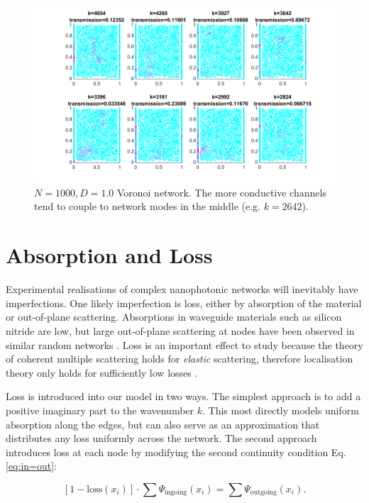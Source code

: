\begin{figure}[hbp]
  \centering
    \includegraphics[width=1\textwidth]{ch3/fig3/kmodes_N1000D10v.png}
    \caption{$N=1000, D=1.0$ Voronoi network. The more conductive channels tend to couple to network modes in the middle (e.g. $k=2642$).} 
    \label{fig:kmodes_N1000D10V}
\end{figure}



\section{Absorption and Loss}
Experimental realisations of complex nanophotonic networks will inevitably have imperfections. One likely imperfection is loss, either by absorption of the material or out-of-plane scattering. Absorptions in waveguide materials such as silicon nitride are low, but large out-of-plane scattering at nodes have been observed in similar random networks \cite{Gaio2017}. Loss is an important effect to study because the theory of coherent multiple scattering holds for \textit{elastic} scattering, therefore localisation theory only holds for sufficiently low losses \cite{Muller2011}.

Loss is introduced into our model in two ways. The simplest approach is to add a positive imaginary part to the wavenumber $k$. This most directly models uniform absorption along the edges, but can also serve as an approximation that distributes any loss uniformly across the network. The second approach introduces loss at each node by modifying the second continuity condition Eq.\ref{eq:in=out}:

\begin{equation}
    \label{eq:in=out+loss}
    [1-\textrm{loss}(x_i)] \cdot \sum \Psi_{\textrm{ingoing}} (x_i) = \sum \Psi_{\textrm{outgoing}} (x_i).
\end{equation}

